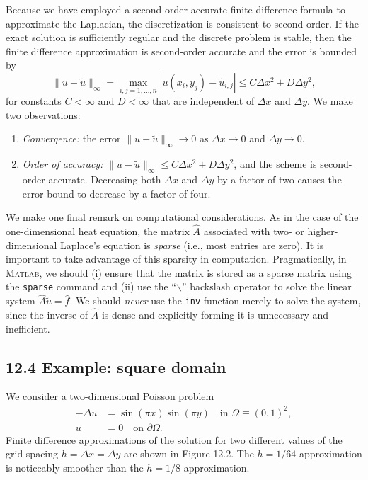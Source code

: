 Because we have employed a second-order accurate finite difference formula to approximate the Laplacian, the discretization is consistent to second order. If the exact solution is sufficiently regular and the discrete problem is stable, then the finite difference approximation is second-order accurate and the error is bounded by
\[\|u - \tilde{u}\|_\infty = \max_{i,j=1,\dots,n} |u(x_i, y_j) - \tilde{u}_{i,j}| \leq C\Delta x^2 + D\Delta y^2,\]
for constants $C < \infty$ and $D < \infty$ that are independent of $\Delta x$ and $\Delta y$. We make two observations:
\begin{enumerate}
    \item \textit{Convergence:} the error $\|u - \tilde{u}\|_\infty \to 0$ as $\Delta x \to 0$ and $\Delta y \to 0$.
    \item \textit{Order of accuracy:} $\|u - \tilde{u}\|_\infty \leq C\Delta x^2 + D\Delta y^2$, and the scheme is second-order accurate. Decreasing both $\Delta x$ and $\Delta y$ by a factor of two causes the error bound to decrease by a factor of four.
\end{enumerate}

We make one final remark on computational considerations. As in the case of the one-dimensional heat equation, the matrix $\hat{A}$ associated with two- or higher-dimensional Laplace's equation is \textit{sparse} (i.e., most entries are zero). It is important to take advantage of this sparsity in computation. Pragmatically, in \textsc{Matlab}, we should (i) ensure that the matrix is stored as a sparse matrix using the \texttt{sparse} command and (ii) use the ``$\backslash$'' backslash operator to solve the linear system $\hat{A}\tilde{u} = \hat{f}$. We should \textit{never} use the \texttt{inv} function merely to solve the system, since the inverse of $\hat{A}$ is dense and explicitly forming it is unnecessary and inefficient.

\subsection{12.4 Example: square domain}
We consider a two-dimensional Poisson problem
\begin{align*}
    -\Delta u &= \sin(\pi x)\sin(\pi y) \quad \text{in } \Omega \equiv (0, 1)^2, \\
    u &= 0 \quad \text{on } \partial\Omega.
\end{align*}
Finite difference approximations of the solution for two different values of the grid spacing $h = \Delta x = \Delta y$ are shown in Figure 12.2. The $h = 1/64$ approximation is noticeably smoother than the $h = 1/8$ approximation.


